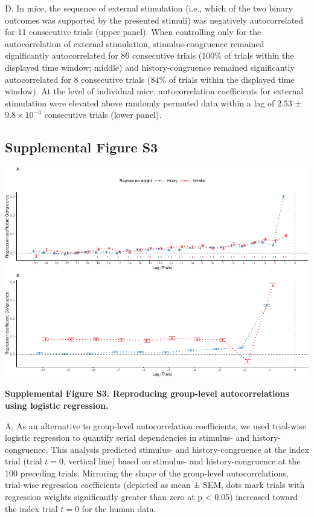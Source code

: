 \documentclass[
]{article}
\begin{document}
D. In mice, the sequence of external stimulation (i.e., which of the two
binary outcomes was supported by the presented stimuli) was negatively
autocorrelated for 11 consecutive trials (upper panel). When controlling
only for the autocorrelation of external stimulation,
stimulus-congruence remained significantly autocorrelated for 86
consecutive trials (100\% of trials within the displayed time window;
middle) and history-congruence remained significantly autocorrelated for
8 consecutive trials (84\% of trials within the displayed time window).
At the level of individual mice, autocorrelation coefficients for
external stimulation were elevated above randomly permuted data within a
lag of \(2.53\) ± \(\ensuremath{9.8\times 10^{-3}}\) consecutive trials
(lower panel).

\newpage

\hypertarget{supplemental-figure-s3}{%
\subsection{Supplemental Figure S3}\label{supplemental-figure-s3}}

\includegraphics{modes_mouse_rev1b_files/figure-latex/Supplememtal_Figure_S3-1.pdf}

\textbf{Supplemental Figure S3. Reproducing group-level autocorrelations
using logistic regression.}

A. As an alternative to group-level autocorrelation coefficients, we
used trial-wise logistic regression to quantify serial dependencies in
stimulus- and history-congruence. This analysis predicted stimulus- and
history-congruence at the index trial (trial \(t = 0\), vertical line)
based on stimulus- and history-congruence at the 100 preceding trials.
Mirroring the shape of the group-level autocorrelations, trial-wise
regression coefficients (depicted as mean ± SEM, dots mark trials with
regression weights significantly greater than zero at p \textless{}
0.05) increased toward the index trial \(t = 0\) for the human data.
\end{document}
